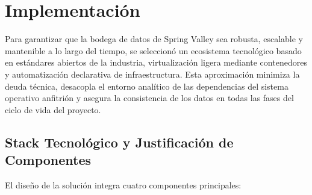 \section{Implementación}
Para garantizar que la bodega de datos de Spring Valley sea robusta, escalable y mantenible a lo largo del tiempo, se seleccionó un ecosistema tecnológico basado en estándares abiertos de la industria, virtualización ligera mediante contenedores y automatización declarativa de infraestructura. Esta aproximación minimiza la deuda técnica, desacopla el entorno analítico de las dependencias del sistema operativo anfitrión y asegura la consistencia de los datos en todas las fases del ciclo de vida del proyecto.

\subsection{Stack Tecnológico y Justificación de Componentes}
El diseño de la solución integra cuatro componentes principales:
